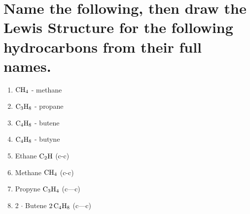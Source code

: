 \documentclass{scrartcl}
\begin{document}
\section{Name the following, then draw the Lewis Structure for the following hydrocarbons from their full names.}
\label{sec:orgd8598a5}

\begin{enumerate}
\item \(\ce{CH4}\) - methane
\item \(\ce{C3H8}\) - propane
\item \(\ce{C4H8}\) - butene
\item \(\ce{C4H8}\) - butyne

\item Ethane \(\ce{C2H}\) (c-c)
\item Methane \(\ce{CH4}\) (c-c)
\item Propyne \(\ce{C3H4}\) (c---c)
\item 2 \(\cdot\) Butene \(\ce{2C4H8}\) (c---c)
\end{enumerate}
\end{document}

